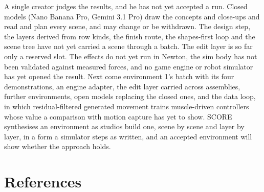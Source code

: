 \documentclass[
  11pt,
]{article}
\begin{document}
A single creator judges the results, and he has not yet accepted a run.
Closed models (Nano Banana Pro, Gemini 3.1 Pro) draw the concepts and
close-ups and read and plan every scene, and may change or be withdrawn.
The design step, the layers derived from row kinds, the finish route,
the shapes-first loop and the scene tree have not yet carried a scene
through a batch. The edit layer is so far only a reserved slot. The
effects do not yet run in Newton, the sim body has not been validated
against measured forces, and no game engine or robot simulator has yet
opened the result. Next come environment 1's batch with its four
demonstrations, an engine adapter, the edit layer carried across
assemblies, further environments, open models replacing the closed ones,
and the data loop, in which residual-filtered generated movement trains
muscle-driven controllers whose value a comparison with motion capture
has yet to show. SCORE synthesises an environment as studios build one,
scene by scene and layer by layer, in a form a simulator steps as
written, and an accepted environment will show whether the approach
holds.

\section*{References}\label{references}
\end{document}
